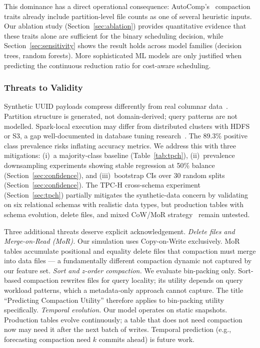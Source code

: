 \documentclass[conference, 10pt]{IEEEtran}
\begin{document}
This dominance has a direct operational consequence:
AutoComp's~\cite{gruenheid2025autocomp} compaction traits already include
partition-level file counts as one of several heuristic inputs. Our
ablation study (Section~\ref{sec:ablation}) provides quantitative evidence
that these traits alone are sufficient for the binary scheduling decision,
while Section~\ref{sec:sensitivity} shows the result holds across model
families (decision trees, random forests). More sophisticated ML models are
only justified when predicting the continuous reduction ratio for
cost-aware scheduling.

\subsubsection{Threats to Validity}
Synthetic UUID payloads compress differently from real columnar
data~\cite{stonebraker2005cstore}.
Partition structure is generated, not domain-derived; query patterns are
not modelled. Spark-local execution may differ from distributed clusters
with HDFS or S3, a gap well-documented in database tuning
research~\cite{vanaken2021inquiry}. The 89.3\% positive class prevalence risks inflating accuracy
metrics. We address this with three mitigations: (i)~a majority-class
baseline (Table~\ref{tab:tpch}), (ii)~prevalence
downsampling experiments showing stable regression at 50\%
balance (Section~\ref{sec:confidence}), and (iii)~bootstrap CIs over
30 random splits (Section~\ref{sec:confidence}). The TPC-H cross-schema experiment
(Section~\ref{sec:tpch}) partially mitigates the synthetic-data concern
by validating on six relational schemas with realistic data types, but
production tables with schema evolution, delete files, and mixed CoW/MoR
strategy~\cite{okolnychyi2024petabyte} remain untested.

Three additional threats deserve explicit acknowledgement.
\emph{Delete files and Merge-on-Read (MoR).}  Our simulation uses
Copy-on-Write exclusively. MoR tables accumulate positional and equality
delete files that compaction must merge into data files ---
a fundamentally different compaction dynamic not captured by our feature
set.
\emph{Sort and z-order compaction.}  We evaluate bin-packing only. Sort-based
compaction rewrites files for query locality; its utility depends on
query workload patterns, which a metadata-only approach cannot capture.
The title ``Predicting Compaction Utility'' therefore applies to
bin-packing utility specifically.
\emph{Temporal evolution.}  Our model operates on static snapshots.
Production tables evolve continuously; a table that does not need
compaction now may need it after the next batch of writes. Temporal
prediction (e.g., forecasting compaction need $k$ commits ahead) is
future work.
\end{document}
